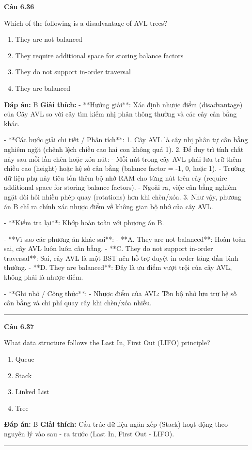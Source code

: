 \documentclass[11pt,a4paper]{article}
\newenvironment{question}[1]{%
  \par\vspace{1em}\noindent\textbf{\large Câu #1}\par\vspace{0.4em}
}{%
  \par\vspace{1em}\hrule\vspace{0.6em}
}
\newenvironment{choices}{%
  \begin{enumerate}[label=\textbf{\Alph*.},leftmargin=2.2em,itemsep=2pt,topsep=3pt]
}{%
  \end{enumerate}
}
\newcommand{\choice}{\item}
\begin{document}
\begin{question}{6.36}
Which of the following is a disadvantage of AVL trees?
\begin{choices}
\choice They are not balanced
\choice They require additional space for storing balance factors
\choice They do not support in-order traversal
\choice They are balanced
\end{choices}
\textbf{Đáp án:} B
\textbf{Giải thích:} - **Hướng giải**:
  Xác định nhược điểm (disadvantage) của Cây AVL so với cây tìm kiếm nhị phân thông thường và các cây cân bằng khác.

- **Các bước giải chi tiết / Phân tích**:
  1. Cây AVL là cây nhị phân tự cân bằng nghiêm ngặt (chênh lệch chiều cao hai con không quá 1).
  2. Để duy trì tính chất này sau mỗi lần chèn hoặc xóa nút:
     - Mỗi nút trong cây AVL phải lưu trữ thêm chiều cao (height) hoặc hệ số cân bằng (balance factor = -1, 0, hoặc 1).
     - Trường dữ liệu phụ này tiêu tốn thêm bộ nhớ RAM cho từng nút trên cây (require additional space for storing balance factors).
     - Ngoài ra, việc cân bằng nghiêm ngặt đòi hỏi nhiều phép quay (rotations) hơn khi chèn/xóa.
  3. Như vậy, phương án B chỉ ra chính xác nhược điểm về không gian bộ nhớ của cây AVL.

- **Kiểm tra lại**:
  Khớp hoàn toàn với phương án B.

- **Vì sao các phương án khác sai**:
  - **A. They are not balanced**: Hoàn toàn sai, cây AVL luôn luôn cân bằng.
  - **C. They do not support in-order traversal**: Sai, cây AVL là một BST nên hỗ trợ duyệt in-order tăng dần bình thường.
  - **D. They are balanced**: Đây là ưu điểm vượt trội của cây AVL, không phải là nhược điểm.

- **Ghi nhớ / Công thức**:
  - Nhược điểm của AVL: Tốn bộ nhớ lưu trữ hệ số cân bằng và chi phí quay cây khi chèn/xóa nhiều.
\end{question}

\begin{question}{6.37}
What data structure follows the Last In, First Out (LIFO) principle?
\begin{choices}
\choice Queue
\choice Stack
\choice Linked List
\choice Tree
\end{choices}
\textbf{Đáp án:} B
\textbf{Giải thích:} Cấu trúc dữ liệu ngăn xếp (Stack) hoạt động theo nguyên lý vào sau - ra trước (Last In, First Out - LIFO).
\end{question}
\end{document}
